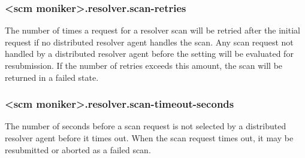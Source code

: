 \subsubsection{<scm moniker>.resolver.scan-retries}\label{sec:resolver-scan-retries}
The number of times a request for a resolver scan will be retried after the initial request if no distributed resolver agent handles the scan.
Any scan request not handled by a distributed resolver agent before the  setting 
will be evaluated for resubmission.  If the number of retries exceeds this amount, the scan will be returned in a failed state.

\subsubsection{<scm moniker>.resolver.scan-timeout-seconds}\label{sec:resolver-scan-timeout-seconds}
The number of seconds before a scan request is not selected by a distributed resolver agent before it times out.  When the scan
request times out, it may be resubmitted or aborted as a failed scan.
